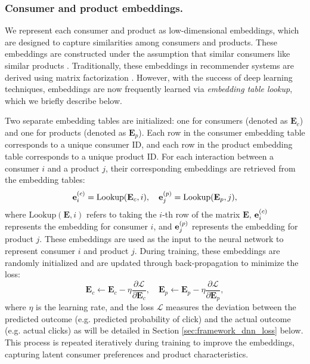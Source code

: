 \subsubsection{Consumer and product embeddings.} 
\label{sec:framework_dnn_cons_embed}  
We represent each consumer and product as low-dimensional embeddings, which are designed to capture similarities among consumers and products. These embeddings are constructed under the assumption that similar consumers like similar products \citep{breese1998empirical}. Traditionally, these embeddings in recommender systems are derived using matrix factorization \citep{dhillon2021modeling, wang2024recommending}. However, with the success of deep learning techniques, embeddings are now frequently learned via \emph{embedding table lookup}, which we briefly describe below.

Two separate embedding tables are initialized: one for consumers (denoted as $\mathbf{E}_{c}$) and one for products (denoted as $\mathbf{E}_{p}$). Each row in the consumer embedding table corresponds to a unique consumer ID, and each row in the product embedding table corresponds to a unique product ID. For each interaction between a consumer $i$ and a product $j$, their corresponding embeddings are retrieved from the embedding tables:
\begin{equation}
\label{eq:embed}
\mathbf{{\bm{e}}}^{(c)}_i = \text{Lookup}(\mathbf{E}_{c}, i), \quad \mathbf{{\bm{e}}}^{(p)}_j = \text{Lookup}(\mathbf{E}_{p}, j),
\end{equation}
where $\text{Lookup}(\mathbf{E}, i)$ refers to taking the $i$-th row of the matrix $\mathbf{E}$, $\mathbf{{\bm{e}}}^{(c)}_i$ represents the embedding for consumer $i$, and $\mathbf{{\bm{e}}}^{(p)}_j$ represents the embedding for product $j$. These embeddings are used as the input to the neural network to represent consumer $i$ and product $j$. During training, these embeddings are randomly initialized and are updated through back-propagation to minimize the loss:
\begin{equation}
\label{eq:embedding_update}
\mathbf{E}_{c} \leftarrow \mathbf{E}_{c} - \eta \frac{\partial \mathcal{L}}{\partial \mathbf{E}_{c}}, \quad \mathbf{E}_{p} \leftarrow \mathbf{E}_{p} - \eta \frac{\partial \mathcal{L}}{\partial \mathbf{E}_{p}},
\end{equation}
where $\eta$ is the learning rate, and the loss $\mathcal{L}$ measures the deviation between the predicted outcome (e.g. predicted probability of click) and the actual outcome (e.g. actual clicks) as will be detailed in Section \ref{sec:framework_dnn_loss} below. This process is repeated iteratively during training to improve the embeddings, capturing latent consumer preferences and product characteristics.

